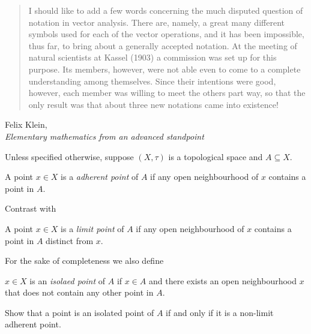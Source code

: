 \documentclass[a4paper]{article}
\begin{document}
\maketitle

\begin{quotation}
  I should like to add a few words concerning the much disputed question of notation in vector analysis. There are, namely, a great many different symbols used for each of the vector operations, and it has been impossible, thus far, to bring about a generally accepted notation. At the meeting of natural scientists at Kassel (1903) a commission was set up for this purpose. Its members, however, were not able even to come to a complete understanding among themselves. Since their intentions were good, however, each member was willing to meet the others part way, so that the only result was that about three new notations came into existence!
\end{quotation}

\begin{flushright}
  Felix Klein, \\
  \emph{Elementary mathematics from an advanced standpoint}
\end{flushright}

Unless specified otherwise, suppose \((X, \tau)\) is a topological space and \(A \subseteq X\).

\begin{definition}
  A point \(x \in X\) is a \emph{adherent point} of \(A\) if any open neighbourhood of \(x\) contains a point in \(A\).
\end{definition}

Contrast with

\begin{definition}
  A point \(x \in X\) is a \emph{limit point} of \(A\) if any open neighbourhood of \(x\) contains a point in \(A\) distinct from \(x\).
\end{definition}

For the sake of completeness we also define

\begin{definition}
  \(x \in X\) is an \emph{isolaed point} of \(A\) if \(x \in A\) and there exists an open neighbourhood \(x\) that does not contain any other point in \(A\).
\end{definition}

\begin{ex}
  Show that a point is an isolated point of \(A\) if and only if it is a non-limit adherent point.
\end{ex}
\end{document}
